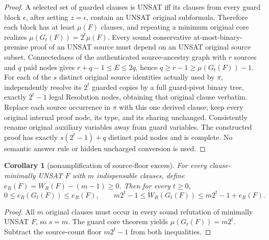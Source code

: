 \documentclass[11pt]{article}
\newtheorem{corollary}[theorem]{Corollary}
\begin{document}
\begin{proof}
A selected set of guarded clauses is UNSAT iff its clauses from every guard block $\epsilon$, after setting $z=\epsilon$, contain an UNSAT original subformula. Therefore each block has at least $\mu(F)$ clauses, and repeating a minimum original core realizes $\mu(G_t(F))=2^t\mu(F)$. Every sound conservative at-most-binary-premise proof of an UNSAT source must depend on an UNSAT original source subset. Connectedness of the authenticated source-ancestry graph with $r$ sources and $q$ paid nodes gives $r+q-1\le E\le2q$, hence $q\ge r-1\ge\mu(G_t(F))-1$.
For each of the $s$ distinct original source identities actually used by $\pi$, independently resolve its $2^t$ guarded copies by a full guard-pivot binary tree, exactly $2^t-1$ legal Resolution nodes, obtaining that original clause verbatim. Replace each source occurrence in $\pi$ with this one derived clause; keep every original internal proof node, its type, and its sharing unchanged. Consistently rename original auxiliary variables away from guard variables. The constructed proof has exactly $s(2^t-1)+q$ distinct paid nodes and is complete. No semantic answer rule or hidden uncharged conversion is used.
\end{proof}
\begin{corollary}[nonamplification of source-floor excess]
For every clause-minimally UNSAT $F$ with $m$ indispensable clauses, define $e_R(F)=W_R(F)-(m-1)\ge0$. Then for every $t\ge0$,
\[
\boxed{0\le e_R(G_t(F))\le e_R(F),\qquad
m2^t-1\le W_R(G_t(F))\le m2^t-1+e_R(F).}
\]
\end{corollary}
\begin{proof}
All $m$ original clauses must occur in every sound refutation of minimally UNSAT $F$, so $s=m$. The guard core theorem yields $\mu(G_t(F))=m2^t$. Subtract the source-count floor $m2^t-1$ from both inequalities.
\end{proof}
\end{document}
